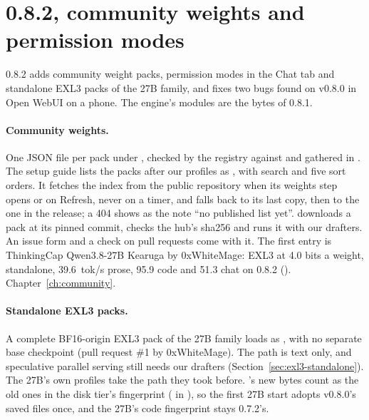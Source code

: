 \section{0.8.2, community weights and permission modes}\label{sec:changelog-082}

0.8.2 adds community weight packs, permission modes in the Chat tab and standalone EXL3 packs of the 27B family, and fixes two bugs found on v0.8.0 in Open WebUI on a phone. The engine's modules are the bytes of 0.8.1.

\paragraph{Community weights.} One JSON file per pack under , checked by the registry against  and gathered in . The setup guide lists the packs after our profiles as , with search and five sort orders. It fetches the index from the public repository when its weights step opens or on Refresh, never on a timer, and falls back to its last copy, then to the one in the release; a 404 shows as the note \enquote{no published list yet}.  downloads a pack at its pinned commit, checks the hub's sha256 and runs it with our drafters. An issue form and a check on pull requests come with it. The first entry is ThinkingCap Qwen3.8-27B Kearuga by 0xWhiteMage: EXL3 at 4.0 bits a weight, standalone, 39.6~tok/s prose, 95.9 code and 51.3 chat on 0.8.2 (\measured). Chapter~\ref{ch:community}.

\paragraph{Standalone EXL3 packs.} A complete BF16-origin  EXL3 pack of the 27B family loads as , with no separate base checkpoint (pull request \#1 by 0xWhiteMage). The path is text only, and speculative parallel serving still needs our drafters (Section~\ref{sec:exl3-standalone}). The 27B's own profiles take the path they took before. 's new bytes count as the old ones in the disk tier's fingerprint ( in ), so the first 27B start adopts v0.8.0's saved files once, and the 27B's code fingerprint stays 0.7.2's.

